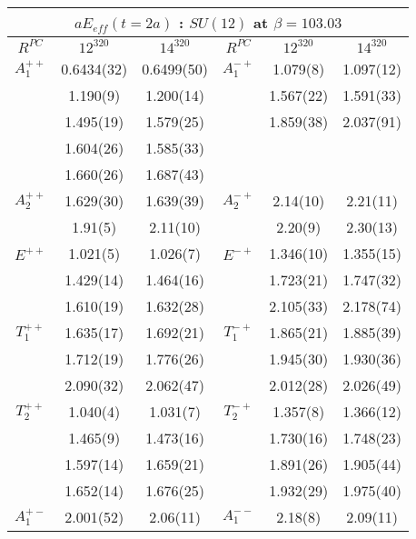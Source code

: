 \documentclass[12pt]{article}
\begin{document}
\begin{table}[htb]
\centering
\begin{tabular}{|c|c|c||c|c|c|} \hline
\multicolumn{6}{|c|}{$aE_{eff}(t=2a)$ : $SU(12)$ at $\beta=103.03$} \\ \hline
  $R^{PC}$   & $12^320$ & $14^320$  &  $R^{PC}$   & $12^320$ & $14^320$  \\ \hline  \hline 
$A_1^{++}$  & 0.6434(32) & 0.6499(50)  &  $A_1^{-+}$ & 1.079(8) & 1.097(12) \\
          & 1.190(9)   & 1.200(14)   &            & 1.567(22)  & 1.591(33)  \\
          & 1.495(19)  & 1.579(25)   &            & 1.859(38)  & 2.037(91) \\
          & 1.604(26)  & 1.585(33)   &            &            &   \\ 
          & 1.660(26)  & 1.687(43)   &            &            &   \\ \hline
$A_2^{++}$  & 1.629(30) & 1.639(39)  & $A_2^{-+}$ & 2.14(10) & 2.21(11)  \\
          & 1.91(5)    & 2.11(10)    &          & 2.20(9)   & 2.30(13)  \\ \hline
$E^{++}$   & 1.021(5)   & 1.026(7)   & $E^{-+}$  & 1.346(10)  & 1.355(15)  \\
          & 1.429(14)  &  1.464(16)  &          & 1.723(21)  & 1.747(32)  \\
          & 1.610(19)  &  1.632(28)  &          & 2.105(33)  & 2.178(74)  \\ \hline
$T_1^{++}$  & 1.635(17) & 1.692(21) & $T_1^{-+}$ & 1.865(21)  & 1.885(39)  \\
          & 1.712(19) & 1.776(26)  &          & 1.945(30)  & 1.930(36)  \\
          & 2.090(32) & 2.062(47)  &          & 2.012(28)  & 2.026(49)  \\ \hline
$T_2^{++}$  & 1.040(4) & 1.031(7)  & $T_2^{-+}$ & 1.357(8) & 1.366(12)  \\
          & 1.465(9) & 1.473(16)  &          & 1.730(16)  & 1.748(23)  \\
          & 1.597(14) & 1.659(21)  &          & 1.891(26)  & 1.905(44)  \\
          & 1.652(14) & 1.676(25)  &          & 1.932(29)  & 1.975(40)  \\ \hline
$A_1^{+-}$  & 2.001(52) & 2.06(11)  & $A_1^{--}$ & 2.18(8)  & 2.09(11)  \\

\end{tabular}
\end{table}
\end{document}
